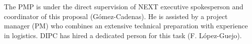 %
 


The PMP is under the direct supervision of NEXT executive spokesperson and coordinator of this proposal (G\'omez-Cadenas). He is assisted by a project manager (PM) who combines an extensive technical preparation with experience in logistics. DIPC has hired a dedicated person for this task (F. L\'opez-Guejo). 

 
